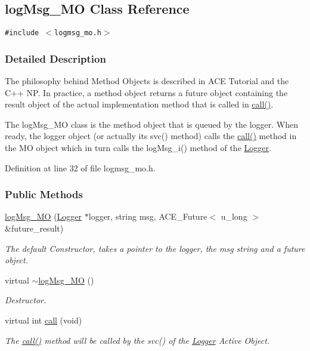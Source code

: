 \hypertarget{classlogMsg__MO}{
\subsection{log\-Msg\_\-MO Class Reference}
\label{classlogMsg__MO}
}
{\tt \#include $<$logmsg\_\-mo.h$>$}



\subsubsection{Detailed Description}
The philosophy behind Method Objects is described in ACE Tutorial and the C++ NP. In practice, a method object returns a future object containing the result object of the actual implementation method that is called in \hyperlink{classlogMsg__MO_logMsg__MOa2}{call()}.

The log\-Msg\_\-MO class is the method object that is queued by the logger. When ready, the logger object (or actually its svc() method) calls the \hyperlink{classlogMsg__MO_logMsg__MOa2}{call()} method in the MO object which in turn calls the log\-Msg\_\-i() method of the \hyperlink{classLogger}{Logger}. 



Definition at line 32 of file logmsg\_\-mo.h.\subsubsection*{Public Methods}
\begin{CompactItemize}
\item 
\hyperlink{classlogMsg__MO_logMsg__MOa0}{log\-Msg\_\-MO} (\hyperlink{classLogger}{Logger} $\ast$logger, string msg, ACE\_\-Future$<$ u\_\-long $>$ \&future\_\-result)
\begin{CompactList}\small\item\em The default Constructor, takes a pointer to the logger, the msg string and a future object.\item\end{CompactList}\item 
virtual \hyperlink{classlogMsg__MO_logMsg__MOa1}{$\sim$log\-Msg\_\-MO} ()
\begin{CompactList}\small\item\em Destructor.\item\end{CompactList}\item 
virtual int \hyperlink{classlogMsg__MO_logMsg__MOa2}{call} (void)
\begin{CompactList}\small\item\em The \hyperlink{classlogMsg__MO_logMsg__MOa2}{call()} method will be called by the svc() of the \hyperlink{classLogger}{Logger} Active Object.\item\end{CompactList}\end{CompactItemize}
